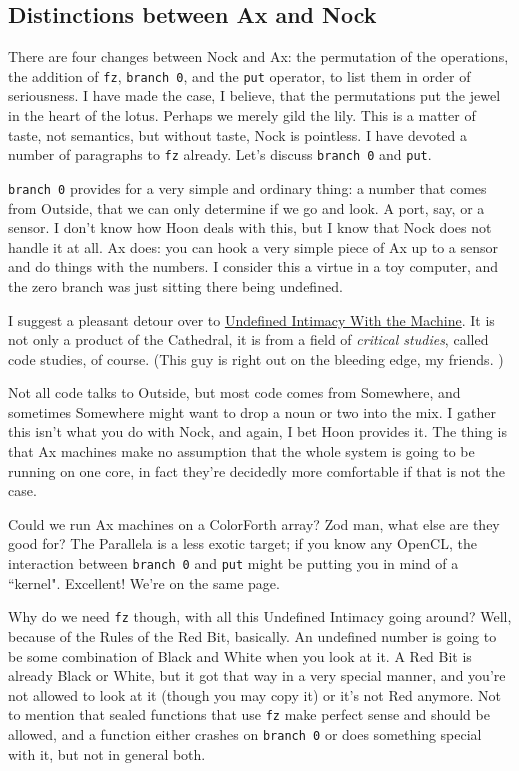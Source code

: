 \documentclass[twoside]{article}
\begin{document}
\subsection{Distinctions between Ax and Nock}

There are four changes between Nock and Ax: the permutation of the operations, the addition of \texttt{fz}, \texttt{branch 0}, and the \texttt{put} operator, to list them in order of seriousness. I have made the case, I believe, that the permutations put the jewel in the heart of the lotus. Perhaps we merely gild the lily. This is a matter of taste, not semantics, but without taste, Nock is pointless. I have devoted a number of paragraphs to \texttt{fz} already. Let's discuss \texttt{branch 0} and \texttt{put}.

\texttt{branch 0} provides for a very simple and ordinary thing: a number that comes from Outside, that we can only determine if we go and look. A port, say, or a sensor. I don't know how Hoon deals with this, but I know that Nock does not handle it at all. Ax does: you can hook a very simple piece of Ax up to a sensor and do things with the numbers. I consider this a virtue in a toy computer, and the zero branch was just sitting there being undefined. 

I suggest a pleasant detour over to \href{http://thoughtmesh.net/publish/367.php}{Undefined Intimacy With the Machine}. It is not only a product of the Cathedral, it is from a field of \emph{critical studies}, called code studies, of course. (This guy is right out on the bleeding edge, my friends. )

Not all code talks to Outside, but most code comes from Somewhere, and sometimes Somewhere might want to drop a noun or two into the mix. I gather this isn't what you do with Nock, and again, I bet Hoon provides it. The thing is that Ax machines make no assumption that the whole system is going to be running on one core, in fact they're decidedly more comfortable if that is not the case. 

Could we run Ax machines on a ColorForth array? Zod man, what else are they good for? The Parallela is a less exotic target; if you know any OpenCL, the interaction between \texttt{branch 0} and \texttt{put} might be putting you in mind of a ``kernel". Excellent! We're on the same page. 

Why do we need \texttt{fz} though, with all this Undefined Intimacy going around? Well, because of the Rules of the Red Bit, basically. An undefined number is going to be some combination of Black and White when you look at it. A Red Bit is already Black or White, but it got that way in a very special manner, and you're not allowed to look at it (though you may copy it) or it's not Red anymore. Not to mention that sealed functions that use \texttt{fz} make perfect sense and should be allowed, and a function either crashes on \texttt{branch 0} or does something special with it, but not in general both. 
\end{document}
